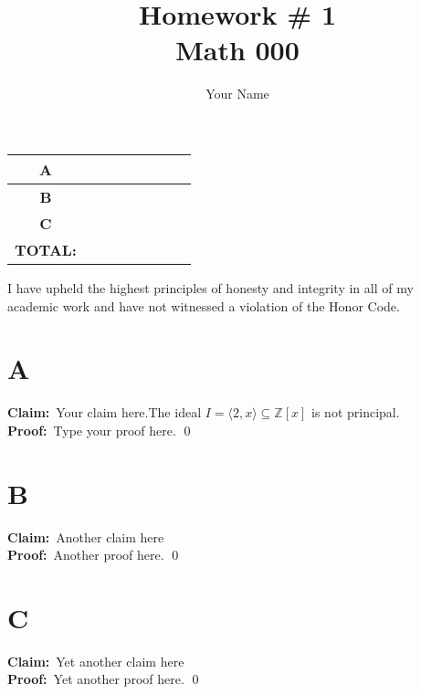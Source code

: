 \documentclass[12PT]{article}
\title{Homework \# 1\\ Math 000}
\author{Your Name}
\newcommand{\Z}{\mathbb{Z}}
\newcommand{\Proof}{\\\noindent\textbf{Proof:}\ }
\newcommand{\Claim}{\noindent\textbf{Claim:}\ }
\newcommand{\prob}[1]{\newpage\section*{#1}}
\begin{document}
\maketitle


\begin{center}
  \begin{tabular}{| c | c |}
    \hline
    \textbf{A}    & \ \ \ \ \ \ \ \ \ \ \ \\ \hline
    \textbf{B}    &                       \\\hline
    \textbf{C}    &                       \\\hline
    \textbf{TOTAL:} &                     \\\hline
  \end{tabular}
\end{center}




\vfill


\begin{center}
  I have upheld the highest principles of honesty and integrity in all of my academic work and have not witnessed a violation of the Honor Code.
  
\end{center}






\prob{A}

\Claim Your claim here.The ideal $I=\langle 2,x\rangle\subseteq\Z[x]$ is not principal.
\Proof Type your proof here.
\qed







\prob{B}

\Claim Another claim here
\Proof Another proof here.
\qed




\prob{C}

\Claim Yet another claim here
\Proof Yet another proof here.
\qed
\end{document}
